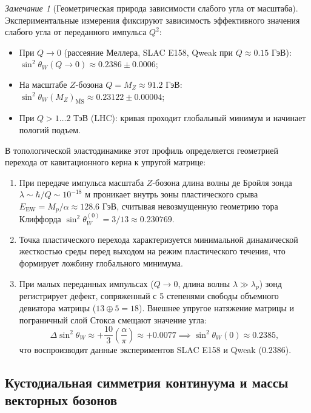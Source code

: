 \documentclass[11pt,a4paper]{article}
\theoremstyle{definition}
\theoremstyle{remark}
\newtheorem{remark}{Замечание}
\begin{document}
\begin{remark}[Геометрическая природа зависимости слабого угла от масштаба]
\label{rem:weinberg_running_geometry}
Экспериментальные измерения фиксируют зависимость эффективного значения слабого угла от переданного импульса $Q^2$:
\begin{itemize}
\item При $Q \to 0$ (рассеяние Меллера, SLAC E158, Qweak при $Q \approx 0.15\text{ ГэВ}$): $\sin^2\theta_W(Q \to 0) \approx 0.2386 \pm 0.0006$;
\item На масштабе $Z$-бозона $Q = M_Z \approx 91.2\text{ ГэВ}$: $\sin^2\theta_W(M_Z)_{\overline{\mathrm{MS}}} \approx 0.23122 \pm 0.00004$;
\item При $Q > 1\dots 2\text{ ТэВ}$ (LHC): кривая проходит глобальный минимум и начинает пологий подъем.
\end{itemize}
В топологической эластодинамике этот профиль определяется геометрией перехода от кавитационного керна к упругой матрице:
\begin{enumerate}
\item При передаче импульса масштаба $Z$-бозона длина волны де Бройля зонда $\lambda \sim \hbar/Q \sim 10^{-18}\text{ м}$ проникает внутрь зоны пластического срыва $E_{\mathrm{EW}} = M_p / \alpha \approx 128.6\text{ ГэВ}$, считывая невозмущенную геометрию тора Клиффорда $\sin^2\theta_W^{(0)} = 3/13 \approx 0.230769$.
\item Точка пластического перехода характеризуется минимальной динамической жесткостью среды перед выходом на режим пластического течения, что формирует ложбину глобального минимума.
\item При малых переданных импульсах ($Q \to 0$, длина волны $\lambda \gg \lambda_p$) зонд регистрирует дефект, сопряженный с 5 степенями свободы объемного девиатора матрицы ($13 \oplus 5 = 18$). Внешнее упругое натяжение матрицы и пограничный слой Стокса смещают значение угла:
\begin{equation}
	\Delta\sin^2\theta_W \approx +\frac{10}{3} \left(\frac{\alpha}{\pi}\right) \approx +0.0077 \implies \sin^2\theta_W(0) \approx 0.2385,
\label{eq:weinberg_low_energy_shift}
\end{equation}
что воспроизводит данные экспериментов SLAC E158 и Qweak ($0.2386$).
\end{enumerate}
\end{remark}
	
\subsection{Кустодиальная симметрия континуума и массы векторных бозонов}
	
\end{document}
